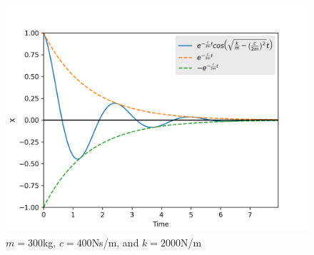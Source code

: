 \documentclass{article}
\begin{document}
\begin{figure}[h]
    \centering
    \includegraphics{Figure1.png}
    \caption{$m=300$kg, $c=400$Ns/m, and $k=2000$N/m}
    \label{fig:1}
\end{figure}
\end{document}

